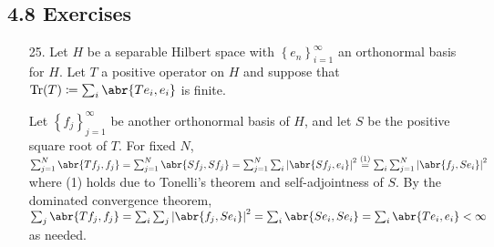 \documentclass[11pt,leqno]{article}
\theoremstyle{plain}
\theoremstyle{definition}
\numberwithin{equation}{section}
\numberwithin{lem}{section}
\newcommand{\cbr}[1]{\left\{#1\right\}}
\newcommand{\eq}[1]{\overset{(#1)}{=}}
\begin{document}
\subsection*{4.8 Exercises}
\begin{enumerate}
    \item[25.] Let $H$ be a separable Hilbert space with $\cbr{e_n}_{i=1}^\infty$ an orthonormal basis for $H$. Let $T$ a positive operator on $H$ and suppose that $\Tr(T)\coloneqq \sum_i\abr{Te_i,e_i}$ is finite.
    
    Let $\cbr{f_j}_{j=1}^\infty$ be another orthonormal basis of $H$, and let $S$ be the positive square root of $T$. For fixed $N$, $\sum_{j=1}^N\abr{Tf_j,f_j} =  \sum_{j=1}^N\abr{Sf_j,Sf_j} = \sum_{j=1}^N\sum_i\abs{\abr{Sf_j,e_i}}^2 \eq{1}  \sum_i \sum_{j=1}^N\abs{\abr{f_j,Se_i}}^2$ where (1) holds due to Tonelli's theorem and self-adjointness of $S$. By the dominated convergence theorem, $\sum_j \abr{Tf_j,f_j} = \sum_i \sum_j \abs{\abr{f_j,Se_i}}^2 = \sum_i\abr{Se_i,Se_i} = \sum_i\abr{Te_i,e_i}<\infty$ as needed.


\end{enumerate}
\end{document}
